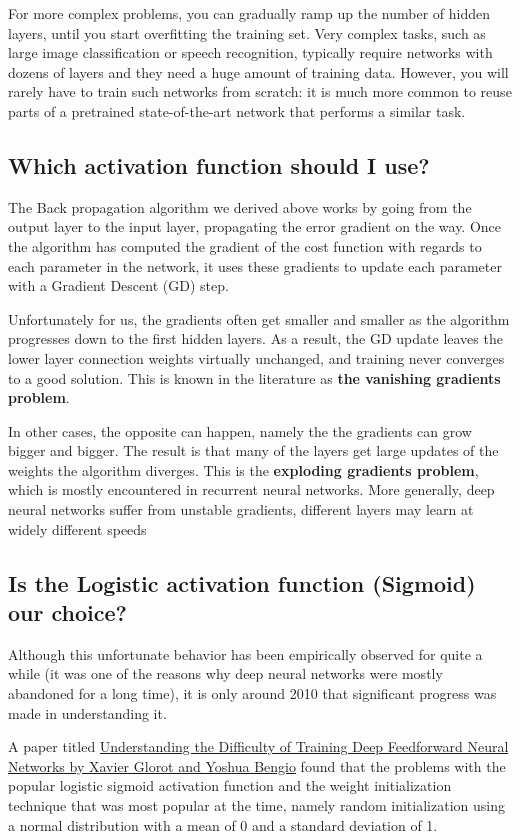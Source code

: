 \documentclass[%
oneside,                 %
final,                   %
10pt]{article}
\begin{document}
For more complex problems, you can gradually ramp up the number of
hidden layers, until you start overfitting the training set. Very
complex tasks, such as large image classification or speech
recognition, typically require networks with dozens of layers and they
need a huge amount of training data. However, you will rarely have to
train such networks from scratch: it is much more common to reuse
parts of a pretrained state-of-the-art network that performs a similar
task.

\subsection{Which activation function should I use?}

The Back propagation algorithm we derived above works by going from
the output layer to the input layer, propagating the error gradient on
the way. Once the algorithm has computed the gradient of the cost
function with regards to each parameter in the network, it uses these
gradients to update each parameter with a Gradient Descent (GD) step.

Unfortunately for us, the gradients often get smaller and smaller as
the algorithm progresses down to the first hidden layers. As a result,
the GD update leaves the lower layer connection weights virtually
unchanged, and training never converges to a good solution. This is
known in the literature as \textbf{the vanishing gradients problem}.

In other cases, the opposite can happen, namely the the gradients can
grow bigger and bigger. The result is that many of the layers get
large updates of the weights the algorithm diverges. This is the
\textbf{exploding gradients problem}, which is mostly encountered in
recurrent neural networks. More generally, deep neural networks suffer
from unstable gradients, different layers may learn at widely
different speeds

\subsection{Is the Logistic activation function (Sigmoid)  our choice?}

Although this unfortunate behavior has been empirically observed for
quite a while (it was one of the reasons why deep neural networks were
mostly abandoned for a long time), it is only around 2010 that
significant progress was made in understanding it.

A paper titled \href{{http://proceedings.mlr.press/v9/glorot10a.html}}{Understanding the Difficulty of Training Deep
Feedforward Neural Networks by Xavier Glorot and Yoshua Bengio} found that
the problems with the popular logistic
sigmoid activation function and the weight initialization technique
that was most popular at the time, namely random initialization using
a normal distribution with a mean of 0 and a standard deviation of
1. 
\end{document}
